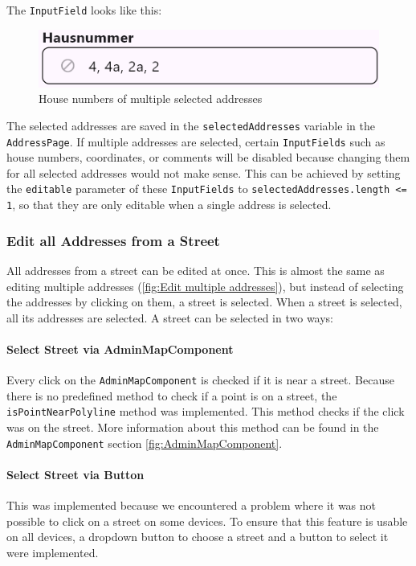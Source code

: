 The \texttt{InputField} looks like this:
\begin{figure}[H]
    \centering
    \includegraphics[width=0.6\linewidth]{images/AdminPanel/listedHouseNumbersInputField.png}
    \caption{House numbers of multiple selected addresses}
\end{figure}

The selected addresses are saved in the \texttt{selectedAddresses} variable in the \texttt{AddressPage}. If multiple addresses are selected, certain \texttt{InputFields} such as house numbers, coordinates, or comments will be disabled because changing them for all selected addresses would not make sense. This can be achieved by setting the \texttt{editable} parameter of these \texttt{InputFields} to \texttt{selectedAddresses.length <= 1}, so that they are only editable when a single address is selected.

\subsubsection{Edit all Addresses from a Street}
All addresses from a street can be edited at once. This is almost the same as editing multiple addresses (\ref{fig:Edit multiple addresses}), but instead of selecting the addresses by clicking on them, a street is selected. When a street is selected, all its addresses are selected. A street can be selected in two ways:

\paragraph{Select Street via AdminMapComponent}
Every click on the \texttt{AdminMapComponent} is checked if it is near a street. Because there is no predefined method to check if a point is on a street, the \texttt{isPointNearPolyline} method was implemented. This method checks if the click was on the street. More information about this method can be found in the \texttt{AdminMapComponent} section \ref{fig:AdminMapComponent}.\\

\paragraph{Select Street via Button}
This was implemented because we encountered a problem where it was not possible to click on a street on some devices. To ensure that this feature is usable on all devices, a dropdown button to choose a street and a button to select it were implemented.\\

